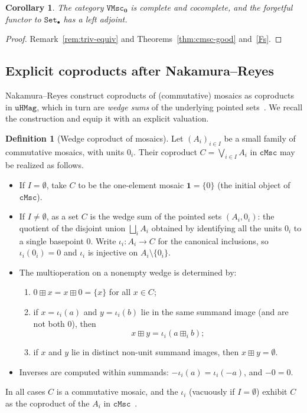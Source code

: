 \documentclass[11pt]{amsart}
\theoremstyle{plain}
\newtheorem{corollary}[theorem]{Corollary}
\theoremstyle{definition}
\newtheorem{definition}[theorem]{Definition}
\theoremstyle{remark}
\newcommand{\Set}{\mathtt{Set}}
\newcommand{\cMsc}{\mathtt{cMsc}}
\newcommand{\VMsc}{\mathtt{VMsc}}
\begin{document}
\begin{corollary}
\label{cor:triv-cocomplete}
The category \(\VMsc_{\mathbf{0}}\) is complete and cocomplete, and the forgetful functor to \(\Set_\bullet\) has a left adjoint.
\end{corollary}

\begin{proof}
Remark~\ref{rem:triv-equiv} and Theorems~\ref{thm:cmsc-good} and~\ref{Fs}.
\end{proof}

\subsection{Explicit coproducts after Nakamura--Reyes}

Nakamura--Reyes construct coproducts of (commutative) mosaics as coproducts in \(\mathtt{uHMag}\), which in turn are \emph{wedge sums} of the underlying pointed sets~\cite[Theorem~3.5, Theorem~4.1]{NR23}. We recall the construction and equip it with an explicit valuation.

\begin{definition}[Wedge coproduct of mosaics]
\label{def:wedge}
Let \((A_i)_{i\in I}\) be a small family of commutative mosaics, with units \(0_i\). Their coproduct \(C=\bigvee_{i\in I}A_i\) in \(\cMsc\) may be realized as follows.
\begin{itemize}
\item If \(I=\emptyset\), take \(C\) to be the one-element mosaic \(\mathbf{1}=\{0\}\) (the initial object of \(\cMsc\)).
\item If \(I\neq\emptyset\), as a set \(C\) is the wedge sum of the pointed sets \((A_i,0_i)\): the quotient of the disjoint union \(\bigsqcup_i A_i\) obtained by identifying all the units \(0_i\) to a single basepoint \(0\). Write \(\iota_i\colon A_i\to C\) for the canonical inclusions, so \(\iota_i(0_i)=0\) and \(\iota_i\) is injective on \(A_i\setminus\{0_i\}\).
\item The multioperation on a nonempty wedge is determined by:
\begin{enumerate}[label=(\roman*)]
\item \(0\boxplus x=x\boxplus 0=\{x\}\) for all \(x\in C\);
\item if \(x=\iota_i(a)\) and \(y=\iota_i(b)\) lie in the same summand image (and are not both \(0\)), then
\[
x\boxplus y=\iota_i(a\boxplus_i b);
\]
\item if \(x\) and \(y\) lie in distinct non-unit summand images, then \(x\boxplus y=\emptyset\).
\end{enumerate}
\item Inverses are computed within summands: \(-\iota_i(a)=\iota_i(-a)\), and \(-0=0\).
\end{itemize}
In all cases \(C\) is a commutative mosaic, and the \(\iota_i\) (vacuously if \(I=\emptyset\)) exhibit \(C\) as the coproduct of the \(A_i\) in \(\cMsc\)~\cite{NR23}.
\end{definition}
\end{document}
